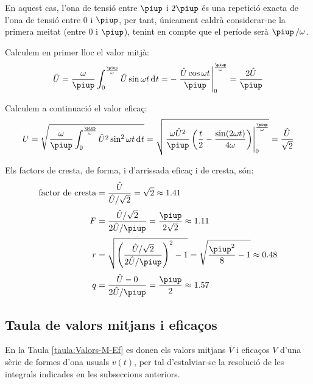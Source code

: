\begin{exemple}
    En aquest cas, l'ona de tensió entre $\piup$ i $2\piup$ és una repetició
    exacta de l'ona de tensió entre 0 i $\piup$, per tant, únicament
    caldrà considerar-ne la primera meitat (entre 0 i $\piup$), tenint en
    compte que el període serà $\piup\,/\omega$.

     Calculem en primer lloc el valor mitjà:
    \[
    \bar{U} = \frac{\omega}{\piup} \int_0^\frac{\piup}{\omega} \hat{U}
    \sin\omega t \diff t  = - \left. \frac{\hat{U} \cos\omega t}{\piup}
    \right|_0^\frac{\piup}{\omega} = \frac{2 \hat{U}}{\piup}
    \]

    Calculem a continuació el valor eficaç:
    \[
    U = \sqrt{\frac{\omega}{\piup} \int_0^\frac{\piup}{\omega} \hat{U}^2
    \sin^2\omega t \diff t } =   \sqrt{\left.\frac{\omega
    \hat{U}^2}{\piup}\left( \frac{t}{2} - \frac{\sin (2\omega t)}{4\omega}
    \right)\right|_0^\frac{\piup}{\omega}}  = \frac{\hat{U}}{\sqrt{2}}
    \]

    Els factors de cresta, de forma, i d'arrissada eficaç i de cresta, són:
    \begin{align*}
        \text{factor de cresta} &= \frac{\hat{U}}{\hat{U}/\sqrt{2}} = \sqrt{2} \approx\num{1,41} \\[0.5ex]
        F &= \frac{\hat{U}/\sqrt{2}}{2 \hat{U}/\piup} =\frac{\piup}{2\sqrt{2}} \approx
        \num{1,11} \\[0.5ex]
    r &= \sqrt{\left(\frac{\hat{U}/\sqrt{2}}{2 \hat{U}/\piup}\right)^2-1}
    = \sqrt{\frac{\piup^2}{8}-1} \approx \num{0,48}\\[0.5ex]
    q &=  \frac{\hat{U} - 0}{2 \hat{U}/\piup} = \frac{\piup}{2} \approx \num{1,57}
    \end{align*}
\end{exemple}


\subsection{Taula de valors mitjans i eficaços}

En la Taula \vref{taula:Valors-M-Ef}  es donen els valors mitjans $\bar{V}$ i eficaços $V$ d'una sèrie de formes d'ona usuals $v(t)$, per tal d'estalviar-se la resolució de les integrals indicades en les subseccions anteriors.

